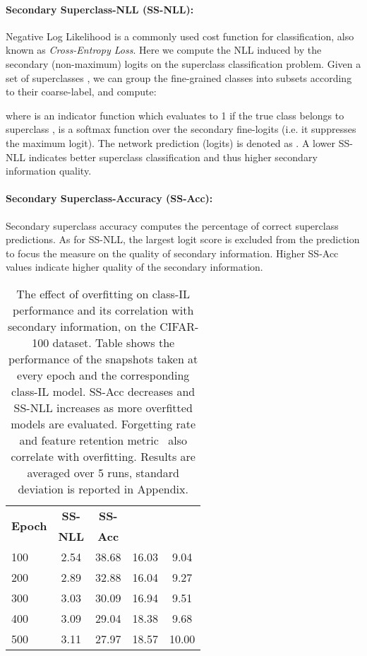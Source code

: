 \documentclass[final]{cvpr}
\newcommand{\cfr}{} \newcommand\todo[1]{(\textcolor{red}{TODO: #1})}
\begin{document}
\paragraph{Secondary Superclass-NLL (SS-NLL):}
Negative Log Likelihood is a commonly used cost function for classification, also known as \textit{Cross-Entropy Loss}.
Here we compute the NLL induced by the secondary (non-maximum) logits on the superclass classification problem. Given a set of superclasses , we can group the fine-grained classes into subsets  according to their coarse-label, and compute:

where  is an indicator function which evaluates to 1 if the true class  belongs to superclass ,  is a softmax function over the secondary fine-logits (i.e. it suppresses the maximum logit). The network prediction (logits) is denoted as . A lower SS-NLL indicates better superclass classification and thus higher secondary information quality.
    
\paragraph{Secondary Superclass-Accuracy (SS-Acc):} Secondary superclass accuracy computes the percentage of correct superclass predictions. As for SS-NLL, the largest logit score is excluded from the prediction to focus the measure on the quality of secondary information.
Higher SS-Acc values indicate higher quality of the secondary information.

\begin{table}[!t]
\centering
\begin{tabular}{|l@{\hskip3pt}|c@{\hskip3pt}|c@{\hskip3pt}|c|@{\hskip3pt}c@{\hskip3pt}|}
    \hline
    \multirow{2}{*}{\textbf{Epoch}}& \textbf{SS-\hspace{5px}} & \textbf{SS-\hspace{5px}} & \multirow{2}{*}{ } & \multirow{2}{*}{\cfr }   \\ & \textbf{NLL}  & \textbf{Acc}  & &  \\
        \hline
        \hline
      100 & 2.54    & 38.68 & 16.03  &  9.04  \\
      200 & 2.89    & 32.88 & 16.04  &  9.27 \\
      300 & 3.03    & 30.09 & 16.94  &  9.51 \\
      400 & 3.09    & 29.04 & 18.38  &  9.68 \\
      500 & 3.11    & 27.97 & 18.57  &  10.00 \\
        \hline
\end{tabular}
\caption{The effect of overfitting on class-IL performance and its correlation with secondary information, on the CIFAR-100 dataset. Table shows the performance of the snapshots taken at every  epoch and the corresponding class-IL model.
SS-Acc decreases and SS-NLL increases as more overfitted models are evaluated. Forgetting rate  and feature retention metric \cfr~also correlate with overfitting. Results are averaged over 5 runs, standard deviation is reported in Appendix.}
\label{tab:overfit_forgetting}
\end{table}
\end{document}
